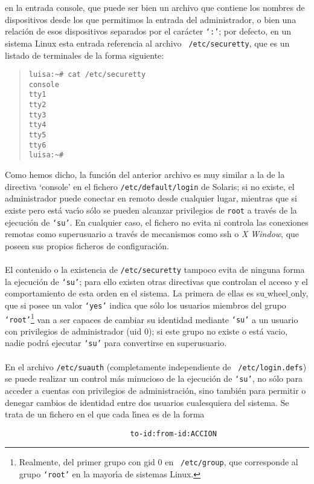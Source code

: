 en la entrada {\sc console}, que puede ser bien un archivo que contiene los
nombres de dispositivos desde los que permitimos la entrada del administrador, o
bien una relaci\'on de esos dispositivos separados por el car\'acter {\tt `:'}; 
por defecto, en un sistema Linux esta entrada referencia al archivo {\tt 
/etc/securetty}, que es un listado de terminales de la forma siguiente:
\begin{quote}
\begin{verbatim}
luisa:~# cat /etc/securetty
console
tty1
tty2
tty3
tty4
tty5
tty6
luisa:~#
\end{verbatim}
\end{quote}
Como hemos dicho, la funci\'on del anterior archivo es muy similar a la de la 
directiva {\sc `console'} en el fichero {\tt /etc/default/login} de Solaris; 
si no existe, el administrador puede conectar en remoto desde cualquier lugar, 
mientras que si existe pero est\'a vac\'{\i}o s\'olo se pueden alcanzar 
privilegios de {\tt root} a trav\'es de la ejecuci\'on de {\tt `su'}. En 
cualquier caso, el fichero no evita ni controla las conexiones remotas como 
superusuario a trav\'es de mecanismos como {\sc ssh} o {\it X Window}, que 
poseen sus propios ficheros de configuraci\'on.\\
\\El contenido o la existencia de {\tt /etc/securetty} tampoco evita de ninguna
forma la ejecuci\'on de {\tt `su'}; para ello existen otras directivas que 
controlan el acceso y el comportamiento de esta orden en el sistema. La primera
de ellas es {\sc su$\_$wheel$\_$only}, que si posee un valor {\tt `yes'} 
indica que s\'olo los usuarios miembros del grupo {\tt 
`root'}\footnote{Realmente, del primer grupo con {\sc gid} 0 en {\tt 
/etc/group}, que corresponde al grupo {\tt `root'} en la mayor\'{\i}a de
sistemas Linux.} van a ser capaces de cambiar su identidad mediante {\tt `su'} 
a un usuario con privilegios de administrador ({\sc uid} 0); si este grupo no 
existe o est\'a vacio, nadie podr\'a ejecutar {\tt `su'} para convertirse en 
superusuario.\\
\\En el archivo {\tt /etc/suauth} (completamente independiente de {\tt 
/etc/login.defs}) se puede realizar un control m\'as minucioso de la ejecuci\'on
de {\tt `su'}, no s\'olo para acceder a cuentas con privilegios de 
administraci\'on, sino tambi\'en para permitir o denegar cambios de identidad
entre dos usuarios cualesquiera del sistema. Se trata de un fichero en el que
cada l\'{\i}nea es de la forma
\begin{verbatim}
                             to-id:from-id:ACCION
\end{verbatim}
